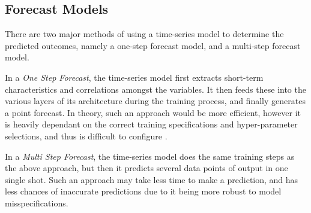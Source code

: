 \subsection{Forecast Models}
\label{subsec:ch2-time-series-forecast-models}

There are two major methods of using a time-series model to determine the predicted outcomes, namely a one-step forecast model, and a multi-step forecast model.\par

In a \textit{One Step Forecast}, the time-series model first extracts short-term characteristics and correlations amongst the variables. It then feeds these into the various layers of its architecture during the training process, and finally generates a point forecast. In theory, such an approach would be more efficient, however it is heavily dependant on the correct training specifications and hyper-parameter selections, and thus is difficult to configure \cite{marcellino2006comparison}.\par

In a \textit{Multi Step Forecast}, the time-series model does the same training steps as the above approach, but then it predicts several data points of output in one single shot. Such an approach may take less time to make a prediction, and has less chances of inaccurate predictions due to it being more robust to model misspecifications.
